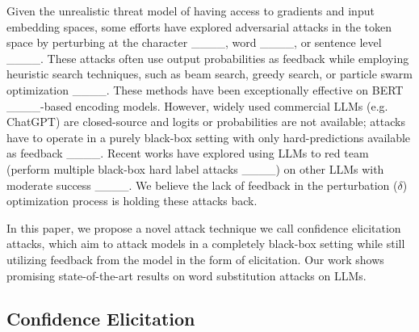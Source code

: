 Given the unrealistic threat model of having access to gradients and input embedding spaces, some efforts have explored adversarial attacks in the token space by perturbing at the character ____, word ____, or sentence level ____. These attacks often use output probabilities as feedback while employing heuristic search techniques, such as beam search, greedy search, or particle swarm optimization ____. These methods have been exceptionally effective on BERT ____-based encoding models. However, widely used commercial LLMs (e.g. ChatGPT) are closed-source and logits or probabilities are not available; attacks have to operate  in a purely black-box setting with only hard-predictions available as feedback ____. Recent works have explored using LLMs to red team (perform multiple black-box hard label attacks ____) on other LLMs with moderate success ____. We believe the lack of feedback in the perturbation ($\delta$) optimization process is holding these attacks back.

In this paper, we propose a novel attack technique we call confidence elicitation attacks, which aim to attack models in a completely black-box setting while still utilizing feedback from the model in the form of elicitation. Our work shows promising state-of-the-art results on word substitution attacks on LLMs.


\subsection{Confidence Elicitation}
\vspace{-0em}

